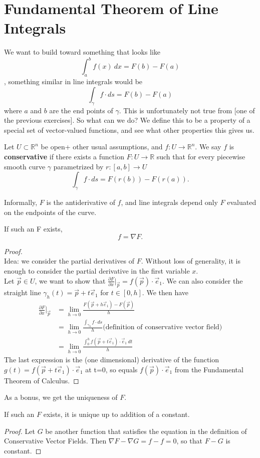 \documentclass[11pt,openany]{book}
\newcommand{\definition}[2]{\begin{tcolorbox}[title=Definition ({#1}),colframe=black]{#2}\end{tcolorbox}
}
\newcommand{\proposition}[1]{\begin{tcolorbox}[title=Proposition,colframe=red!50!blue!20!white,colback=red!35!blue!10!white, coltitle=black]{#1}\end{tcolorbox}
}
\begin{document}
	\section*{Fundamental Theorem of Line Integrals}
	We want to build toward something that looks like 
	\[
		\int_{a}^{b} f(x) \ dx = F(b) - F(a)
	\], something similar in line integrals would be \[
		\int_\gamma f \cdot ds = F(b) - F(a)
	\] where $a$ and $b$ are the end points of $\gamma$. This is unfortunately not true from [one of the previous exercises]. So what can we do? We define this to be a property of a special set of vector-valued functions, and see what other properties this gives us.
	
	\definition{Conservative Vector Fields}{
		Let $U\subset\mathbb{R}^n$ be open+ other usual assumptions, and $f:U\to\mathbb{R}^n$. We say $f$ is \textbf{conservative} if there exists a function $F:U\to\mathbb{R}$ such that for every piecewise smooth curve $\gamma$ parametrized by $r: [a,b]\to U$
		\[
			\int_\gamma f \cdot ds = F(r(b)) - F(r(a)).
		\] 
	}
	Informally, $F$ is the antiderivative of $f$, and line integrals depend only $F$ evaluated on the endpoints of the curve.
	\proposition{
		If such an F exists, \[
			f = \nabla F.
		\]
	}
	\begin{proof} \ \\
		Idea: we consider the partial derivatives of $F$. Without loss of generality, it is enough to consider the partial derivative in the first variable $x$. \\
		Let $\vec{p} \in U$, we want to show that $\frac{\partial F}{\partial x} \big| _{\vec{p}} = f(\vec{p}) \cdot \vec{e}_1$. We can also consider the straight line $\gamma_h(t) = \vec{p} + t\vec{e}_1$ for $t\in[0,h]$. We then have \begin{align*}
			\frac{\partial F}{\partial x} \big| _{\vec{p}} &= \lim_{h\to 0} \frac{F(\vec{p}+h\vec{e}_1)-F(\vec{p})}{h} \\
			&= \lim_{h\to 0} \frac{\int_{\gamma_h} f \cdot ds}{h} \textrm{(definition of conservative vector field)}\\
			&= \lim_{h\to 0} \frac{\int_0^h f(\vec{p}+t\vec{e}_1) \cdot \vec{e}_1 \ dt}{h}
		\end{align*}
		The last expression is the (one dimensional) derivative of the function $g(t)=f(\vec{p}+t\vec{e}_1) \cdot \vec{e}_1$ at t=0, so equals $f(\vec{p})\cdot \vec{e}_1$ from the Fundamental Theorem of Calculus.
	\end{proof}
	
	As a bonus, we get the uniqueness of $F$.
	\proposition{
		If such an $F$ exists, it is unique up to addition of a constant.
	}
	\begin{proof}
		Let $G$ be another function that satisfies the equation in the definition of Conservative Vector Fields. Then $\nabla F - \nabla G = f-f =0$, so that $F-G$ is constant.
	\end{proof}
	
\end{document}
